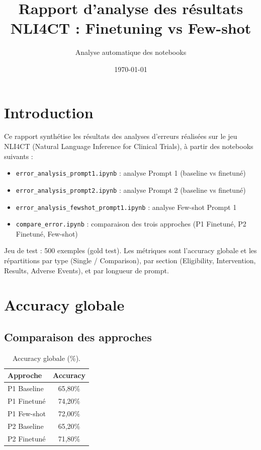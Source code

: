 \documentclass[11pt,a4paper]{article}
\title{Rapport d'analyse des résultats \\ NLI4CT : Finetuning vs Few-shot}
\author{Analyse automatique des notebooks}
\date{\today}
\begin{document}
\maketitle
\tableofcontents
\newpage

\section{Introduction}

Ce rapport synthétise les résultats des analyses d'erreurs réalisées sur le jeu NLI4CT (Natural Language Inference for Clinical Trials), à partir des notebooks suivants :
\begin{itemize}
  \item \texttt{error\_analysis\_prompt1.ipynb} : analyse Prompt 1 (baseline vs finetuné)
  \item \texttt{error\_analysis\_prompt2.ipynb} : analyse Prompt 2 (baseline vs finetuné)
  \item \texttt{error\_analysis\_fewshot\_prompt1.ipynb} : analyse Few-shot Prompt 1
  \item \texttt{compare\_error.ipynb} : comparaison des trois approches (P1 Finetuné, P2 Finetuné, Few-shot)
\end{itemize}

Jeu de test : 500 exemples (gold test). Les métriques sont l’accuracy globale et les répartitions par type (Single / Comparison), par section (Eligibility, Intervention, Results, Adverse Events), et par longueur de prompt.

\section{Accuracy globale}

\subsection{Comparaison des approches}

\begin{table}[H]
  \centering
  \caption{Accuracy globale (\%).}
  \label{tab:acc-globale}
  \begin{tabular}{lc}
    \toprule
    Approche & Accuracy \\
    \midrule
    P1 Baseline & 65,80\% \\
    P1 Finetuné & 74,20\% \\
    P1 Few-shot & 72,00\% \\
    P2 Baseline & 65,20\% \\
    P2 Finetuné & 71,80\% \\
    \bottomrule
  \end{tabular}
\end{table}
\end{document}
